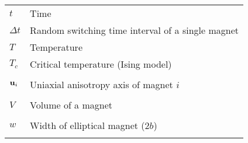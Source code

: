 \begin{longtable}[l]{p{60pt} p{350pt}}
	$t$ & Time \\
	$\Delta t$ & Random switching time interval of a single magnet \\
	$T$ & Temperature \\
	$T_c$ & Critical temperature (Ising model) \\
	&\\

	$\boldsymbol{\mathbf{u}}_i$ & Uniaxial anisotropy axis of magnet $i$ \\
	&\\

	$V$ & Volume of a magnet \\
	&\\

	$w$ & Width of elliptical magnet ($2b$) \\
	&\\
\end{longtable}

